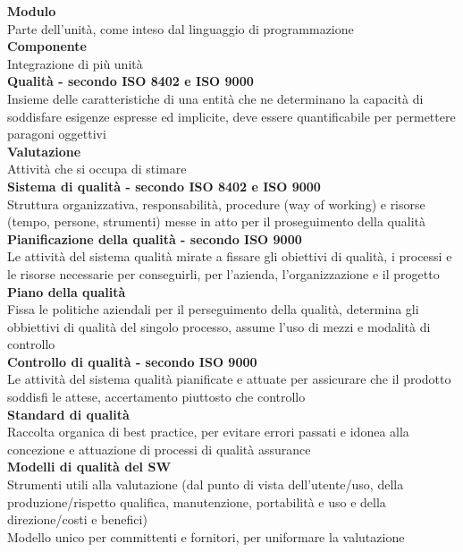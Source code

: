 \documentclass{article}
\begin{document}
		\textbf{Modulo}\\
		Parte dell'unità, come inteso dal linguaggio di programmazione\\
		
		\textbf{Componente}\\
		Integrazione di più unità\\
		
		\textbf{Qualità - secondo ISO 8402 e ISO 9000}\\
		Insieme delle caratteristiche di una entità che ne determinano la capacità di soddisfare esigenze espresse ed implicite, deve essere quantificabile per permettere paragoni oggettivi\\
		
		\textbf{Valutazione}\\
		Attività che si occupa di stimare\\
		
		\textbf{Sistema di qualità - secondo ISO 8402 e ISO 9000}\\
		Struttura organizzativa, responsabilità, procedure (way of working) e risorse (tempo, persone, strumenti) messe in atto per il proseguimento della qualità\\
		
		\textbf{Pianificazione della qualità - secondo ISO 9000}\\
		Le attività del sistema qualità mirate a fissare gli obiettivi di qualità, i processi e le risorse necessarie per conseguirli, per l'azienda, l'organizzazione e il progetto\\
				
		\textbf{Piano della qualità}\\
		Fissa le politiche aziendali per il perseguimento della qualità, determina gli obbiettivi di qualità del singolo processo, assume l'uso di mezzi e modalità di controllo\\
		
		\textbf{Controllo di qualità - secondo ISO 9000}\\
		Le attività del sistema qualità pianificate e attuate per assicurare che il prodotto soddisfi le attese, accertamento piuttosto che controllo\\
		
		\textbf{Standard di qualità}\\
		Raccolta organica di best practice, per evitare errori passati e idonea alla concezione e attuazione di processi di qualità assurance\\
		
		\textbf{Modelli di qualità del SW}\\
		Strumenti utili alla valutazione (dal punto di vista dell'utente/uso, della produzione/rispetto qualifica, manutenzione, portabilità e uso e della direzione/costi e benefici)\\
		Modello unico per committenti e fornitori, per uniformare la valutazione\\
		
\end{document}
